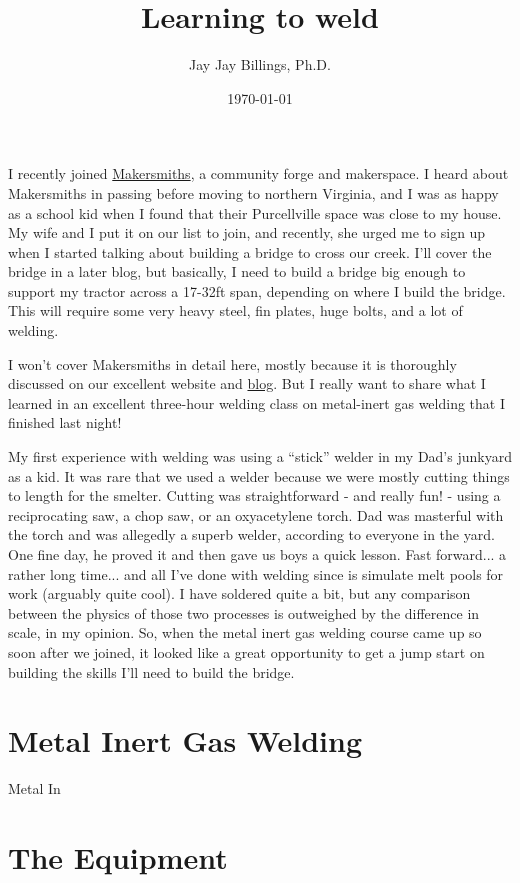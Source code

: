 \documentclass{article}
\title{Learning to weld}
\author{Jay Jay Billings, Ph.D.}
\date{\today}
\begin{document}
\maketitle

I recently joined \href{https://makersmiths.org/}{Makersmiths}, a community forge and makerspace. I heard about Makersmiths in passing before moving to northern Virginia, and I was as happy as a school kid when I found that their Purcellville space was close to my house. My wife and I put it on our list to join, and recently, she urged me to sign up when I started talking about building a bridge to cross our creek. I'll cover the bridge in a later blog, but basically, I need to build a bridge big enough to support my tractor across a 17-32ft span, depending on where I build the bridge. This will require some very heavy steel, fin plates, huge bolts, and a lot of welding.

I won't cover Makersmiths in detail here, mostly because it is thoroughly discussed on our excellent website and \href{https://makersmiths.org/Blog}{blog}. But I really want to share what I learned in an excellent three-hour welding class on metal-inert gas welding that I finished last night! 

My first experience with welding was using a ``stick'' welder in my Dad's junkyard as a kid. It was rare that we used a welder because we were mostly cutting things to length for the smelter. Cutting was straightforward - and really fun! - using a reciprocating saw, a chop saw, or an oxyacetylene torch. Dad was masterful with the torch and was allegedly a superb welder, according to everyone in the yard. One fine day, he proved it and then gave us boys a quick lesson. Fast forward... a rather long time... and all I've done with welding since is simulate melt pools for work (arguably quite cool). I have soldered quite a bit, but any comparison between the physics of those two processes is outweighed by the difference in scale, in my opinion. So, when the metal inert gas welding course came up so soon after we joined, it looked like a great opportunity to get a jump start on building the skills I'll need to build the bridge.

\section*{Metal Inert Gas Welding}

Metal In

\section*{The Equipment}
\end{document}
